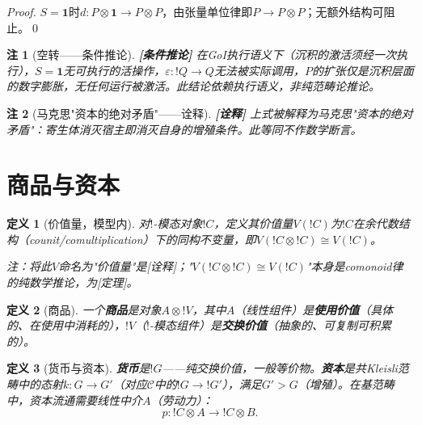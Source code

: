\documentclass[11pt,a4paper]{article}
\newtheorem{definition}{定义}
\newtheorem{remark}{注}
\newcommand{\lvl}[1]{\hfill\textbf{\footnotesize[#1]}}
\newcommand{\lvC}{\lvl{条件推论}}
\newcommand{\lvI}{\lvl{诠释}}
\newcommand{\cat}[1]{\mathcal{#1}}
\newcommand{\C}{\cat{C}}
\newcommand{\I}{\mathbf{1}}
\newcommand{\bang}{{!}}
\newcommand{\tensor}{\otimes}
\newcommand{\eps}{\varepsilon}
\begin{document}
\begin{proof}
$S=\I$时$d:P\tensor\I\to P\tensor P$，由张量单位律即$P\to P\tensor P$；无额外结构可阻止。\qed
\end{proof}

\begin{remark}[空转——条件推论]\lvC
在GoI执行语义下（沉积的激活须经一次执行），$S=\I$无可执行的活操作，$\eps:\bang Q\to Q$无法被实际调用，$P$的扩张仅是沉积层面的数字膨胀，无任何运行被激活。此结论依赖执行语义，非纯范畴论推论。
\end{remark}

\begin{remark}[马克思"资本的绝对矛盾"——诠释]\lvI
上式被解释为马克思"资本的绝对矛盾"：寄生体消灭宿主即消灭自身的增殖条件。此等同不作数学断言。
\end{remark}

\section{商品与资本}

\begin{definition}[价值量，模型内]\label{def:value-magnitude}
对$\bang$-模态对象$\bang C$，定义其价值量$V(\bang C)$为$\bang C$在余代数结构（counit/comultiplication）下的同构不变量，即$V(\bang C\tensor\bang C)\cong V(\bang C)$。

注：将此$V$命名为"价值量"是[诠释]；"$V(\bang C\tensor\bang C)\cong V(\bang C)$"本身是comonoid律的纯数学推论，为[定理]。
\end{definition}

\begin{definition}[商品]\label{def:commodity}
一个\textbf{商品}是对象$A\tensor\bang V$，其中$A$（线性组件）是\textbf{使用价值}（具体的、在使用中消耗的），$\bang V$（$\bang$-模态组件）是\textbf{交换价值}（抽象的、可复制可积累的）。
\end{definition}

\begin{definition}[货币与资本]\label{def:money-capital}
\textbf{货币}是$\bang G$——纯交换价值，一般等价物。\textbf{资本}是共Kleisli范畴中的态射$k:G\to G'$（对应$\C$中的$\bang G\to\bang G'$），满足$G'>G$（增殖）。在基范畴中，资本流通需要线性中介$A$（劳动力）：
$$p : \bang C\tensor A \to \bang C\tensor B.$$
\end{definition}
\end{document}
